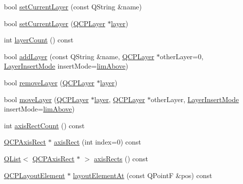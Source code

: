 \begin{DoxyCompactItemize}
\item 
bool \hyperlink{class_q_custom_plot_a73a6dc47c653bb6f8f030abca5a11852}{set\+Current\+Layer} (const Q\+String \&name)
\item 
bool \hyperlink{class_q_custom_plot_a23a4d3cadad1a0063c5fe19aac5659e6}{set\+Current\+Layer} (\hyperlink{class_q_c_p_layer}{Q\+C\+P\+Layer} $\ast$\hyperlink{class_q_custom_plot_aac492da01782820454e9136a8db28182}{layer})
\item 
int \hyperlink{class_q_custom_plot_a1b3926884f5bd4bdda1495d8b3c891d0}{layer\+Count} () const 
\item 
bool \hyperlink{class_q_custom_plot_ad5255393df078448bb6ac83fa5db5f52}{add\+Layer} (const Q\+String \&name, \hyperlink{class_q_c_p_layer}{Q\+C\+P\+Layer} $\ast$other\+Layer=0, \hyperlink{class_q_custom_plot_a75a8afbe6ef333b1f3d47abb25b9add7}{Layer\+Insert\+Mode} insert\+Mode=\hyperlink{class_q_custom_plot_a75a8afbe6ef333b1f3d47abb25b9add7a56ffb40bbf81e9b5d869cffc88999a36}{lim\+Above})
\item 
bool \hyperlink{class_q_custom_plot_a40f75e342c5eaab6a86066a42a0e2a94}{remove\+Layer} (\hyperlink{class_q_c_p_layer}{Q\+C\+P\+Layer} $\ast$\hyperlink{class_q_custom_plot_aac492da01782820454e9136a8db28182}{layer})
\item 
bool \hyperlink{class_q_custom_plot_ae896140beff19424e9e9e02d6e331104}{move\+Layer} (\hyperlink{class_q_c_p_layer}{Q\+C\+P\+Layer} $\ast$\hyperlink{class_q_custom_plot_aac492da01782820454e9136a8db28182}{layer}, \hyperlink{class_q_c_p_layer}{Q\+C\+P\+Layer} $\ast$other\+Layer, \hyperlink{class_q_custom_plot_a75a8afbe6ef333b1f3d47abb25b9add7}{Layer\+Insert\+Mode} insert\+Mode=\hyperlink{class_q_custom_plot_a75a8afbe6ef333b1f3d47abb25b9add7a56ffb40bbf81e9b5d869cffc88999a36}{lim\+Above})
\item 
int \hyperlink{class_q_custom_plot_a340fa24b1607e445cedda9685670ead3}{axis\+Rect\+Count} () const 
\item 
\hyperlink{class_q_c_p_axis_rect}{Q\+C\+P\+Axis\+Rect} $\ast$ \hyperlink{class_q_custom_plot_a4a37a1add5fe63060ac518cf0a4c4050}{axis\+Rect} (int index=0) const 
\item 
\hyperlink{class_q_list}{Q\+List}$<$ \hyperlink{class_q_c_p_axis_rect}{Q\+C\+P\+Axis\+Rect} $\ast$ $>$ \hyperlink{class_q_custom_plot_afd67094aaeccbc5719761348b2d8c891}{axis\+Rects} () const 
\item 
\hyperlink{class_q_c_p_layout_element}{Q\+C\+P\+Layout\+Element} $\ast$ \hyperlink{class_q_custom_plot_a840458186d4483c8a42d6a399448d38f}{layout\+Element\+At} (const Q\+PointF \&pos) const 

\end{DoxyCompactItemize}
